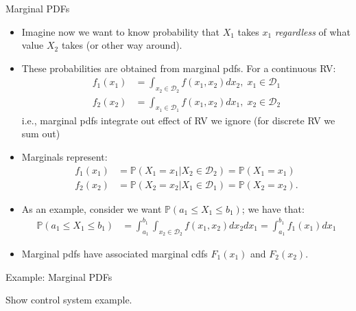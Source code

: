 \documentclass[9pt]{beamer}
\begin{document}
%
\begin{frame}{Marginal PDFs}

\begin{itemize}

\item Imagine now we want to know probability that $X_1$ takes $x_1$ {\em regardless} of what value $X_2$ takes (or other way around). 

\item These probabilities are obtained from {\em} marginal pdfs. For a continuous RV:
\begin{align*}
f_1(x_1)&=\int_{x_2\in \mathcal{D}_2}f(x_1,x_2)dx_2,\; x_1\in \mathcal{D}_1\\
f_2(x_2)&=\int_{x_1\in \mathcal{D}_1}f(x_1,x_2)dx_1,\; x_2\in \mathcal{D}_2
\end{align*}
i.e., marginal pdfs integrate out effect of RV we ignore (for discrete RV we sum out)
\item Marginals represent:
\begin{align*}
f_1(x_1)&=\mathbb{P}(X_1=x_1|X_2\in \mathcal{D}_2)=\mathbb{P}(X_1=x_1)\\
f_2(x_2)&=\mathbb{P}(X_2=x_2|X_1\in \mathcal{D}_1)=\mathbb{P}(X_2=x_2).
\end{align*}
\item As an example, consider we want $\mathbb{P}(a_1\leq X_1\leq b_1)$; we have that:
\begin{align*}
\mathbb{P}(a_1\leq X_1\leq b_1)&=\int_{a_1}^{b_1}\int_{x_2\in \mathcal{D}_2} f(x_1,x_2)dx_2dx_1=\int_{a_1}^{b_1}f_1(x_1)dx_1
\end{align*}
\item Marginal pdfs have associated marginal cdfs $F_1(x_1)$ and $F_2(x_2)$.

\end{itemize}

\end{frame}

%
\begin{frame}{Example: Marginal PDFs}

\begin{block}{}
{\color{red} Show control system example.}
\end{block}

\end{frame}
\end{document}
